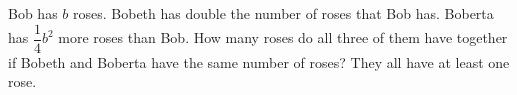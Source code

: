 Bob has $b$ roses. Bobeth has double the number of roses that Bob has. Boberta has $\dfrac{1}{4} b^2$ more roses than Bob. How many roses do all three of them have together if Bobeth and Boberta have the same number of roses? They all have at least one rose.
